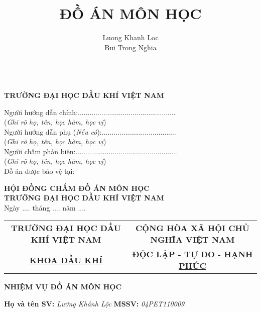 \documentclass[12pt,a4paper]{article}
\title{\textbf{ĐỒ ÁN MÔN HỌC}}
\author{Luong Khanh Loc\\Bui Trong Nghia}
\begin{document}
\clearpage

\maketitle
\newpage
\begin{center}
	\centering
	\\ 
	\textbf{TRƯỜNG ĐẠI HỌC DẦU KHÍ VIỆT NAM}
\end{center}
Người hướng dẫn chính:..................................................\\
(\textit{Ghi rõ họ, tên, học hàm, học vị})\\
\newline
Người hướng dẫn phụ (\textit{Nếu có}):......................................\\
(\textit{Ghi rõ họ, tên, học hàm, học vị})\\
\newline
Người chấm phản biện:....................................................\\
(\textit{Ghi rõ họ, tên, học hàm, học vị})\\
\newline
\newline
\newline
\newline
\newline
\newline
Đồ án được bảo vệ tại:
\begin{center}
	\centering
	\textbf{HỘI ĐỒNG CHẤM ĐỒ ÁN MÔN HỌC}\\
	\textbf{TRƯỜNG ĐẠI HỌC DẦU KHÍ VIỆT NAM}\\
	Ngày .... tháng .... năm ....
\end{center}
\newpage
\begin{table}[h]
\centering
\label{my-label}
\begin{tabular}{cc}
 \textbf{TRƯỜNG ĐẠI HỌC DẦU KHÍ VIỆT NAM} & \textbf{CỘNG HÒA XÃ HỘI CHỦ NGHĨA VIỆT NAM} \\
 \underline{\textbf{KHOA DẦU KHÍ}}& \underline{\textbf{ĐỘC LẬP - TỰ DO - HẠNH PHÚC}}
\end{tabular}
\end{table}
\begin{center}
	\centering
	\textbf{NHIỆM VỤ ĐỒ ÁN MÔN HỌC}
\end{center}

\textbf{Họ và tên SV:} \textit{Lương Khánh Lộc} \hspace{98pt} \textbf{MSSV:} \textit{04PET110009} 
\end{document}
